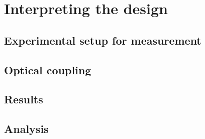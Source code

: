 \documentclass[../report.tex]{subfiles}
\begin{document}
	
\chapter{Interpreting the design}

	\section{Experimental setup for measurement}
	
	\section{Optical coupling}
	
	\section{Results}
	
	\section{Analysis}
	
\end{document}
